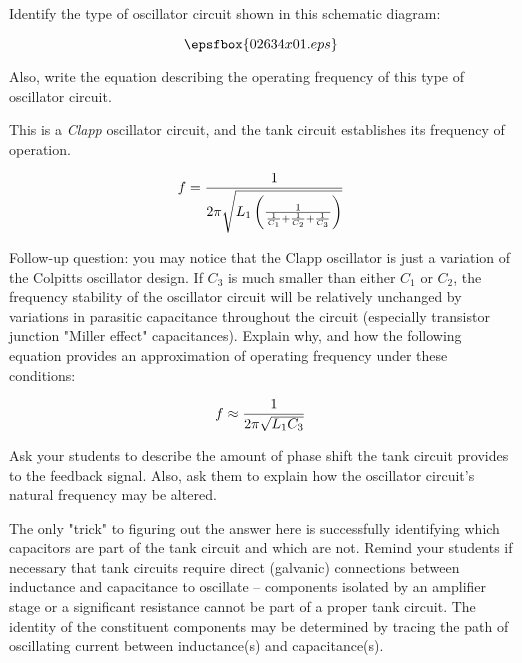 

Identify the type of oscillator circuit shown in this schematic diagram:

$$\epsfbox{02634x01.eps}$$

Also, write the equation describing the operating frequency of this type of oscillator circuit.







This is a {\it Clapp} oscillator circuit, and the tank circuit establishes its frequency of operation.

$$f = {1 \over {2 \pi \sqrt{L_1 \left({1 \over {{1 \over C_1} + {1 \over C_2} + {1 \over C_3}}}\right)}}}$$

\vskip 10pt

Follow-up question: you may notice that the Clapp oscillator is just a variation of the Colpitts oscillator design.  If $C_3$ is much smaller than either $C_1$ or $C_2$, the frequency stability of the oscillator circuit will be relatively unchanged by variations in parasitic capacitance throughout the circuit (especially transistor junction "Miller effect" capacitances).  Explain why, and how the following equation provides an approximation of operating frequency under these conditions:

$$f \approx {1 \over {2 \pi \sqrt{L_1 C_3}}}$$







Ask your students to describe the amount of phase shift the tank circuit provides to the feedback signal.  Also, ask them to explain how the oscillator circuit's natural frequency may be altered.

The only "trick" to figuring out the answer here is successfully identifying which capacitors are part of the tank circuit and which are not.  Remind your students if necessary that tank circuits require direct (galvanic) connections between inductance and capacitance to oscillate -- components isolated by an amplifier stage or a significant resistance cannot be part of a proper tank circuit.  The identity of the constituent components may be determined by tracing the path of oscillating current between inductance(s) and capacitance(s).




